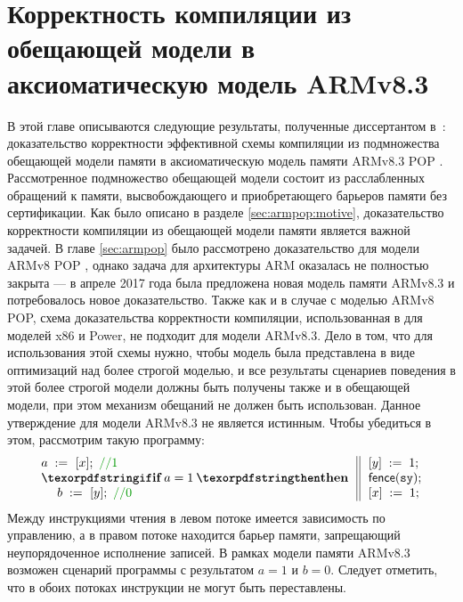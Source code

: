 \chapter{Корректность компиляции из обещающей модели в аксиоматическую модель ARMv8.3} \label{sec:armv83}
В этой главе описываются следующие результаты, полученные диссертантом
в~\cite{Podkopaev-al:NTV17,Podkopaev-al:ISPRAS17}:
доказательство корректности эффективной схемы компиляции из
подмножества обещающей модели памяти \cite{Kang-al:POPL17} в аксиоматическую
модель памяти ARMv8.3 POP \cite{Pulte-al:POPL18}.
Рассмотренное подмножество обещающей модели состоит из расслабленных обращений к памяти,
высвобождающего и приобретающего барьеров памяти без сертификации.
Как было описано в разделе \ref{sec:armpop:motive}, доказательство корректности
компиляции из обещающей модели памяти является важной задачей. 
В главе \ref{sec:armpop} было рассмотрено доказательство для модели ARMv8 POP \cite{Flur-al:POPL16},
однако задача для архитектуры ARM оказалась не полностью закрыта --- 
в апреле 2017 года была предложена новая модель памяти ARMv8.3 \cite{ARMv82,Pulte-al:POPL18} и потребовалось новое доказательство. 
Также как и в случае с моделью ARMv8 POP, схема доказательства корректности компиляции,
использованная в \cite{Kang-al:POPL17} для моделей x86 и Power, не подходит для модели ARMv8.3.
Дело в том, что для использования этой схемы нужно, чтобы модель была представлена в виде оптимизаций над более строгой
моделью, и все результаты сценариев поведения в этой более строгой модели должны быть получены также и в обещающей модели, при этом 
механизм обещаний не должен быть использован.
Данное утверждение для модели ARMv8.3 не является истинным.
Чтобы убедиться в этом, рассмотрим такую программу:
\[\inarrII{
\readInst{a}{x}; ~\valuecom{1} \\
\itne{a=1}{\readInst{b}{y}; ~\valuecom{0}} 
}
{
\writeInst{y}{1}; \\
\fenceInst{\SY}; \\
\writeInst{x}{1};
}\]
Между инструкциями чтения в левом потоке имеется  зависимость по управлению, а в правом потоке находится барьер памяти, запрещающий неупорядоченное  исполнение записей.
В рамках модели памяти ARMv8.3 возможен сценарий программы с результатом $a = 1$ и $b = 0$. Следует отметить, 
что в обоих потоках инструкции не могут быть переставлены. 
